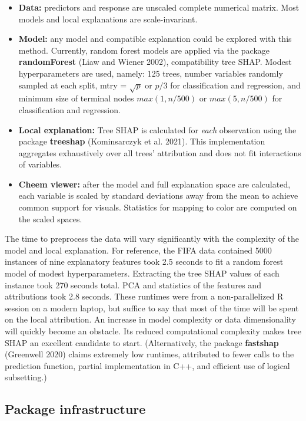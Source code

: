 \documentclass[
]{article}
\providecommand{\tightlist}{%
  \setlength{\itemsep}{0pt}\setlength{\parskip}{0pt}}
\begin{document}
\begin{itemize}
\tightlist
\item
  \textbf{Data:} predictors and response are unscaled complete numerical
  matrix. Most models and local explanations are scale-invariant.
\item
  \textbf{Model:} any model and compatible explanation could be explored
  with this method. Currently, random forest models are applied via the
  package \textbf{randomForest} (Liaw and Wiener 2002), compatibility
  tree SHAP. Modest hyperparameters are used, namely: 125 trees, number
  variables randomly sampled at each split, mtry = \(\sqrt{p}\) or
  \(p/3\) for classification and regression, and minimum size of
  terminal nodes \(max(1, n/500)\) or \(max(5, n/500)\) for
  classification and regression.
\item
  \textbf{Local explanation:} Tree SHAP is calculated for \emph{each}
  observation using the package \textbf{treeshap} (Kominsarczyk et al.
  2021). This implementation aggregates exhaustively over all trees'
  attribution and does not fit interactions of variables.
\item
  \textbf{Cheem viewer:} after the model and full explanation space are
  calculated, each variable is scaled by standard deviations away from
  the mean to achieve common support for visuals. Statistics for mapping
  to color are computed on the scaled spaces.
\end{itemize}

The time to preprocess the data will vary significantly with the
complexity of the model and local explanation. For reference, the FIFA
data contained 5000 instances of nine explanatory features took 2.5
seconds to fit a random forest model of modest hyperparameters.
Extracting the tree SHAP values of each instance took 270 seconds total.
PCA and statistics of the features and attributions took 2.8 seconds.
These runtimes were from a non-parallelized R session on a modern
laptop, but suffice to say that most of the time will be spent on the
local attribution. An increase in model complexity or data
dimensionality will quickly become an obstacle. Its reduced
computational complexity makes tree SHAP an excellent candidate to
start. (Alternatively, the package \textbf{fastshap} (Greenwell 2020)
claims extremely low runtimes, attributed to fewer calls to the
prediction function, partial implementation in C++, and efficient use of
logical subsetting.)

\hypertarget{sec:infrastructure}{%
\subsection{Package infrastructure}\label{sec:infrastructure}}
\end{document}
